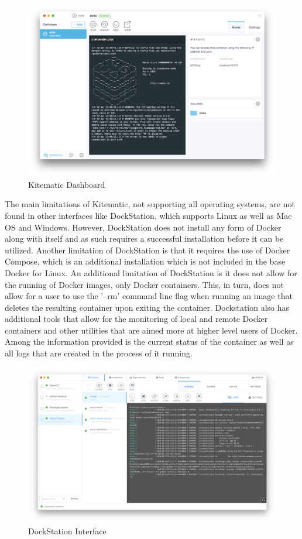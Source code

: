 \begin{figure}[h!]
    \centering
    \includegraphics[width=5in]{images/Kitematic}
    \caption{Kitematic Dashboard}
\end{figure}

The main limitations of Kitematic, not supporting all operating systems, are not found in other interfaces like DockStation, which supports Linux as well as Mac OS and Windows. However, DockStation \cite{dockstation} does not install any form of Docker along with itself and as such requires a successful installation before it can be utilized. Another limitation of DockStation is that it requires the use of Docker Compose, which is an additional installation which is not included in the base Docker for Linux. An additional limitation of DockStation is it does not allow for the running of Docker images, only Docker containers. This, in turn, does not allow for a user to use the '--rm' command line flag when running an image that deletes the resulting container upon exiting the container. Dockstation also has additional tools that allow for the monitoring of local and remote Docker containers and other utilities that are aimed more at higher level users of Docker. Among the information provided is the current status of the container as well as all logs that are created in the process of it running.

\begin{figure}[h!]
    \centering
    \includegraphics[width=5in]{images/DockStation}
    \caption{DockStation Interface}
\end{figure}

